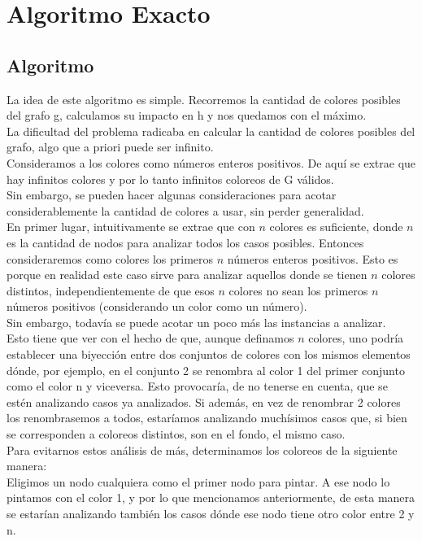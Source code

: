 \section{Algoritmo Exacto}

\subsection{Algoritmo}

\indent La idea de este algoritmo es simple. Recorremos la cantidad de colores posibles del grafo g, calculamos su impacto en h y nos quedamos con el máximo.\\
\indent La dificultad del problema radicaba en calcular la cantidad de colores posibles del grafo, algo que a priori puede ser infinito.\\
\indent Consideramos a los colores como números enteros positivos. De aquí se extrae que hay infinitos colores y por lo tanto infinitos coloreos de G válidos.\\
\indent Sin embargo, se pueden hacer algunas consideraciones para acotar considerablemente la cantidad de colores a usar, sin perder generalidad.\\
\indent En primer lugar, intuitivamente se extrae que con $n$ colores es suficiente, donde $n$ es la cantidad de nodos para analizar todos los casos posibles. Entonces consideraremos como colores los primeros $n$ números enteros positivos. Esto es porque en realidad este caso sirve para analizar aquellos donde se tienen $n$ colores distintos, independientemente de que esos $n$ colores no sean los primeros $n$ números positivos (considerando un color como un número).\\
\indent Sin embargo, todavía se puede acotar un poco más las instancias a analizar.\\
\indent Esto tiene que ver con el hecho de que, aunque definamos $n$ colores, uno podría establecer una biyección entre dos conjuntos de colores con los mismos elementos dónde, por ejemplo, en el conjunto 2 se renombra al color 1 del primer conjunto como el color n y viceversa. Esto provocaría, de no tenerse en cuenta, que se estén analizando casos ya analizados. Si además, en vez de renombrar 2 colores los renombrasemos a todos, estaríamos analizando muchísimos casos que, si bien se corresponden a coloreos distintos, son en el fondo, el mismo caso.\\
\indent Para evitarnos estos análisis de más, determinamos los coloreos de la siguiente manera:\\
\indent Eligimos un nodo cualquiera como el primer nodo para pintar. A ese nodo lo pintamos con el color 1, y por lo que mencionamos anteriormente, de esta manera se estarían analizando también los casos dónde ese nodo tiene otro color entre 2 y n.\\
